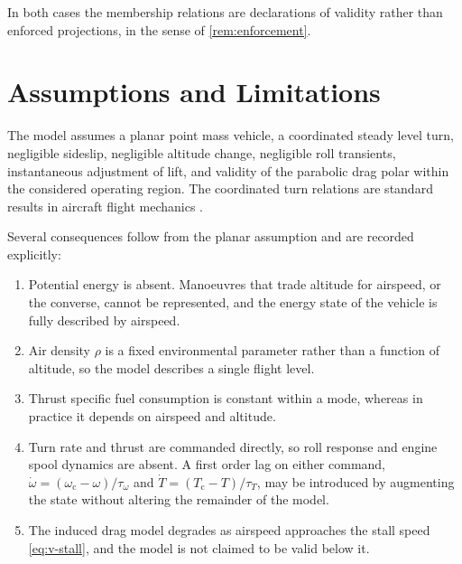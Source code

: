 \documentclass[11pt,a4paper]{article}
\begin{document}
In both cases the membership relations are declarations of validity rather than
enforced projections, in the sense of \cref{rem:enforcement}.

\section{Assumptions and Limitations}

The model assumes a planar point mass vehicle, a coordinated steady level turn,
negligible sideslip, negligible altitude change, negligible roll transients,
instantaneous adjustment of lift, and validity of the parabolic drag polar within
the considered operating region. The coordinated turn relations are standard
results in aircraft flight mechanics \cite{faa-phak}.

Several consequences follow from the planar assumption and are recorded
explicitly:

\begin{enumerate}
  \item Potential energy is absent. Manoeuvres that trade altitude for airspeed,
        or the converse, cannot be represented, and the energy state of the
        vehicle is fully described by airspeed.
  \item Air density $\rho$ is a fixed environmental parameter rather than a
        function of altitude, so the model describes a single flight level.
  \item Thrust specific fuel consumption is constant within a mode, whereas in
        practice it depends on airspeed and altitude.
  \item Turn rate and thrust are commanded directly, so roll response and engine
        spool dynamics are absent. A first order lag on either command,
        $\dot\omega = (\omega_{\mathrm{c}} - \omega)/\tau_\omega$ and
        $\dot T = (T_{\mathrm{c}} - T)/\tau_T$, may be introduced by augmenting
        the state without altering the remainder of the model.
  \item The induced drag model degrades as airspeed approaches the stall speed
        \cref{eq:v-stall}, and the model is not claimed to be valid below it.
\end{enumerate}
\end{document}
